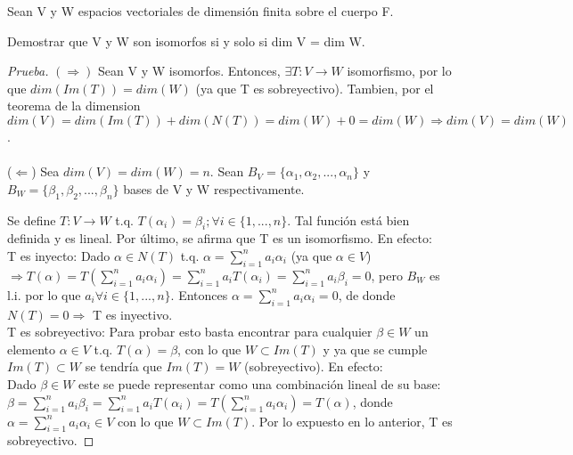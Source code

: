 \documentclass[12pt]{article}
\newenvironment{problem}[2][Problem]{\begin{trivlist}
\item[\hskip \labelsep {\bfseries #1}\hskip \labelsep {\bfseries #2.}]}{\end{trivlist}}
\begin{document}
\begin{problem}[Problema]{3}
Sean V y W espacios vectoriales de dimensión finita sobre el cuerpo F.
\end{problem}

\begin{problem}[Problema]{3.a}
Demostrar que V y W son isomorfos si y solo si dim V = dim W.
\end{problem}

\begin{proof} [Prueba]
$(\Rightarrow)$ Sean V y W isomorfos. Entonces, $\exists T:V\longrightarrow W$ isomorfismo, por lo que $dim(Im(T))=dim(W)$ (ya que T es sobreyectivo). Tambien, por el teorema de la dimension $dim(V)=dim(Im(T))+dim(N(T))=dim(W)+0=dim(W) \Longrightarrow dim(V)=dim(W)$.\\
\\
($\Leftarrow$) Sea $dim(V)=dim(W)=n$. Sean $B_V=\{\alpha_{1}, \alpha_{2}, ..., \alpha_{n}\}$ y $B_W=\{\beta_{1}, \beta_{2}, ..., \beta_{n}\}$ bases de V y W respectivamente. 

Se define $T:V \longrightarrow W$ t.q. $T(\alpha_{i})=\beta_{i}; \forall i \in \{1,...,n\}$. Tal función está bien definida y es lineal. Por último, se afirma que T es un isomorfismo. En efecto:\\
T es inyecto: Dado $\alpha \in N(T)$ t.q. $\alpha=\sum_{i=1}^{n}a_{i}\alpha_{i}$ (ya que $\alpha \in V$) $\Longrightarrow T(\alpha)=T(\sum_{i=1}^{n}a_{i}\alpha_{i})=\sum_{i=1}^{n}a_{i}T(\alpha_{i})=\sum_{i=1}^{n}a_{i}\beta_{i} = 0$, pero $B_W$ es l.i. por lo que $a_{i} \forall i \in \{1,...,n\}$. Entonces $\alpha=\sum_{i=1}^{n}a_{i}\alpha_{i}=0$, de donde $N(T)={0} \Longrightarrow$ T es inyectivo.\\
T es sobreyectivo: Para probar esto basta encontrar para cualquier $\beta \in W$ un elemento $\alpha \in V$ t.q. $T(\alpha)=\beta$, con lo que $W \subset Im(T)$ y ya que se cumple $Im(T) \subset W$ se tendría que $Im(T) = W$ (sobreyectivo). En efecto:\\
Dado $\beta \in W$ este se puede representar como una combinación lineal de su base: $\beta = \sum_{i=1}^{n}a_{i}\beta_{i}=\sum_{i=1}^{n}a_{i}T(\alpha_{i})= T(\sum_{i=1}^{n}a_{i}\alpha_{i})=T(\alpha)$, donde $\alpha=\sum_{i=1}^{n}a_{i}\alpha_{i} \in V$ con lo que $W \subset Im(T)$. Por lo expuesto en lo anterior, T es sobreyectivo.
\end{proof}
\end{document}
